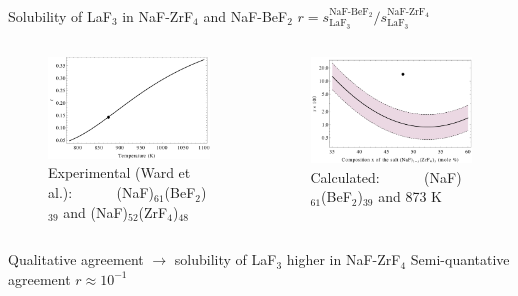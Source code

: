 \documentclass{beamer}
\begin{document}
\begin{frame}{Solubility of LaF$_3$ in NaF-ZrF$_4$ and NaF-BeF$_2$}
    $ r = s_{\text{LaF}_3}^{\text{NaF-BeF}_2} / s_{\text{LaF}_3}^{\text{NaF-ZrF}_4}$
    \begin{columns}
        \begin{column}{6cm}
            \begin{figure}
                \includegraphics[width=\textwidth]{solRatioEvoWithT}
                \caption{Experimental (Ward et al.): ~~~~~ (NaF)$_{61}$(BeF$_2$)$_{39}$ and (NaF)$_{52}$(ZrF$_4$)$_{48}$}
            \end{figure}
        \end{column}
        \begin{column}{6cm}
            \begin{figure}
                \includegraphics[width=\textwidth]{deducted_solubilities}
                \caption{Calculated: ~~~~~ (NaF)$_{61}$(BeF$_2$)$_{39}$ and 873 K}
            \end{figure}
        \end{column}
    \end{columns}
    Qualitative agreement $\rightarrow$ solubility of LaF$_3$ higher in NaF-ZrF$_4$
    Semi-quantative agreement $r\approx 10^{-1}$
\end{frame}
\end{document}

